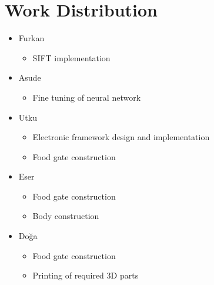 \section{Work Distribution}
\label{sec:workDistribution}



\begin{itemize}
    \item Furkan
    \begin{itemize}
        \item SIFT implementation
    \end{itemize}
    \item Asude
    \begin{itemize}
        \item Fine tuning of neural network
    \end{itemize}
    \item Utku
    \begin{itemize}
        \item Electronic framework design and implementation
        \item Food gate construction
    \end{itemize}
    \item Eser
    \begin{itemize}
        \item Food gate construction
        \item Body construction
    \end{itemize}
    \item Doğa
    \begin{itemize}
        \item Food gate construction
        \item Printing of required 3D parts
    \end{itemize}
\end{itemize}
